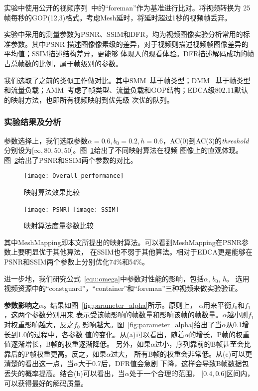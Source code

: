 实验中使用公开的视频序列~\cite{videos}中的“foreman”作为基准进行比对。将视频转换为
25帧每秒的GOP(12,3)格式。考虑Mesh延时，将延时超过1秒的视频帧丢弃。

实验中采用的测量参数为PSNR、SSIM和DFR，均为视频图像实验分析常用的标准参数。其中PSNR
描述图像像素级的差异，对于视频则描述视频帧图像差异的平均值；SSIM描述结构差异，更能够
体现人的观看体验。DFR描述解码成功的帧占总帧数的比例，属于帧级别的参数。

我们选取了之前的类似工作做对比。其中SMM~\cite{SMM}基于帧类型；DMM~\cite{DMM}
基于帧类型和流量负载；AMM~\cite{AMM}考虑了帧类型、流量负载和GOP结构；EDCA级802.11默认的映射方法，也即所有视频映射到优先级
次优的队列。

\subsubsection{实验结果及分析}
参数选择上，我们选取参数$\alpha=0.6, b_{0}=0.2, h=0.6$，AC(0)到AC(3)的\emph{threshold}
分别设为$\lbrack\infty, 80, 50, 50\rbrack$。图~\ref{fig:overall_performance}给出了不同映射算法在视频
图像上的直观体现。图~\ref{fig:parameters}给出了PSNR和SSIM两个参数的对比。

\begin{figure}[H] %
  \centering
  \texttt{[image: Overall\_performance]}
  \caption{映射算法效果比较}
  \label{fig:overall_performance}
\end{figure}

\begin{figure}[h]
  \centering
  \subcaptionbox{}
      {\texttt{[image: PSNR]}}
  \hspace{1em}
  \subcaptionbox{}
    {\texttt{[image: SSIM]}}
  \caption{映射算法度量参数比较}
  \label{fig:parameters}
\end{figure}

其中MeshMapping即本文所提出的映射算法。可以看到MeshMapping在PSNR参数上要明显优于其他算法，
在SSIM也不弱于其他算法。相对于EDCA更是能够在PSNR和SSIM两个参数上分别优化74\%和54\%。

进一步地，我们研究公式~\ref{equ:omega}中参数对性能的影响，包括$\alpha$, $b_{0}$, \emph{h}。
选用视频资源中的“coastguard”，“container”和“foreman”三种视频来做实验验证。

\textbf{参数影响之$\alpha$}。结果如图~\ref{fig:parameter_alpha}所示。原则上，
$\alpha$用来平衡$f_{0}$和$f_{1}$，这两个参数分别用来
表示受该帧影响的帧数量和影响该帧的帧数量。$\alpha$越小则$f_{1}$对权重影响越大，反之$f_{0}$
影响越大。图~\ref{fig:parameter_alpha}给出了当$\alpha$从0.1增长到1.0的过程中，各参数
值的变化。从(a)可以看出，随着$\alpha$的增长，P帧的权重值逐渐增长，B帧的权重逐渐降低。
另外，如果$\alpha$过小，序列靠前的B帧甚至会比靠后的P帧权重更高。反之，如果$\alpha$过大，
所有B帧的权重会非常低。从(c)可以更清楚的看出这一点，当$\alpha$大于0.7后，DFR值会急剧
下降，这样会导致B帧数据包丢失的概率提高。结合(b)可以看出，当$\alpha$处于一个合理的范围，
$\lbrack0.4,0.6\rbrack$区间内，可以获得最好的解码质量。

